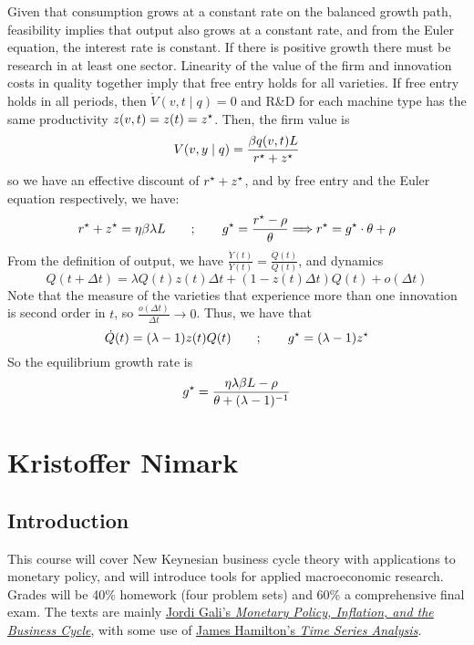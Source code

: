 \documentclass[10pt]{article}
\begin{document}
\begin{model}
	Given that consumption grows at a constant rate on the balanced growth path, feasibility implies that output also grows at a constant rate, and from the Euler equation, the interest rate is constant. If there is positive growth there must be research in at least one sector. Linearity of the value of the firm and innovation costs in quality together imply that free entry holds for all varieties. If free entry holds in all periods, then $\dot{V}(v,t \mid q) = 0$ and R\&D for each machine type has the same productivity $z(v,t) = z(t) = z^\star$. Then, the firm value is\[V(v,y \mid q) = \frac{\beta q(v,t)L}{r^\star + z^\star}\]so we have an effective discount of $r^\star + z^\star$, and by free entry and the Euler equation respectively, we have: \[r^\star + z^\star = \eta \beta \lambda L \qquad ; \qquad g^\star = \frac{r^\star - \rho}{\theta}\Longrightarrow r^\star = g^\star\cdot\theta + \rho\]From the definition of output, we have $\frac{\dot{Y}(t)}{Y(t)} = \frac{\dot{Q}(t)}{Q(t)}$, and dynamics \[Q(t+\Delta t) = \lambda Q(t)z(t)\Delta t + (1-z(t)\Delta t)Q(t) + o(\Delta t)\]Note that the measure of the varieties that experience more than one innovation is second order in $t$, so $\frac{o(\Delta t)}{\Delta t} \to 0$. Thus, we have that \[\dot{Q}(t) = (\lambda - 1) z(t)Q(t) \qquad ; \qquad g^\star = (\lambda - 1)z^\star\]So the equilibrium growth rate is \[g^\star = \frac{\eta \lambda \beta L - \rho }{\theta + (\lambda-1)^{-1}}\]
\end{model}




\newpage
\section{Kristoffer Nimark}

\subsection{Introduction}\label{subsec:1}

This course will cover New Keynesian business cycle theory with applications to monetary policy, and will introduce tools for applied macroeconomic research. Grades will be 40\% homework (four problem sets) and 60\% a comprehensive final exam. The texts are mainly \href{https://press.princeton.edu/books/hardcover/9780691164786/monetary-policy-inflation-and-the-business-cycle}{Jordi Gali's \emph{Monetary Policy, Inflation, and the Business Cycle}}, with some use of \href{https://agorism.dev/book/finance/time-series/James\%20Douglas\%20Hamilton\%20-\%20Time\%20Series\%20Analysis\%20\%281994\%2C\%20Princeton\%20University\%20Press\%29\%20-\%20libgen.lc.pdf}{James Hamilton's \emph{Time Series Analysis}}.
\end{document}
